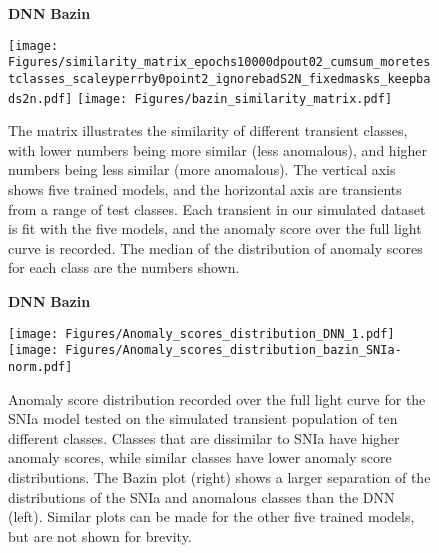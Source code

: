 \documentclass[fleqn,usenatbib]{mnras}
\begin{document}
\begin{figure*}
    \begin{flushleft}
        \hspace{0.26\linewidth} \textbf{DNN} \hspace{0.45\linewidth} \textbf{Bazin}\par\medskip
        \vspace{-7em}
    \end{flushleft}
    \centering
    \texttt{[image: Figures/similarity\_matrix\_epochs10000dpout02\_cumsum\_moretestclasses\_scaleyperrby0point2\_ignorebadS2N\_fixedmasks\_keepbads2n.pdf]}
    \texttt{[image: Figures/bazin\_similarity\_matrix.pdf]}
    \vspace{-3em}
    \caption{The matrix illustrates the similarity of different transient classes, with lower numbers being more similar (less anomalous), and higher numbers being less similar (more anomalous). The vertical axis shows five trained models, and the horizontal axis are transients from a range of test classes. Each transient in our simulated dataset is fit with the five models, and the anomaly score over the full light curve is recorded. The median of the distribution of anomaly scores for each class are the numbers shown.}
    \label{fig:similarity_matrix}
\end{figure*}

\begin{figure*}
    \begin{flushleft}
        \hspace{0.27\linewidth} \textbf{DNN} \hspace{0.45\linewidth} \textbf{Bazin}\par\medskip
        \vspace{-0.1em}
    \end{flushleft}
    \centering
    \texttt{[image: Figures/Anomaly\_scores\_distribution\_DNN\_1.pdf]}
    \texttt{[image: Figures/Anomaly\_scores\_distribution\_bazin\_SNIa-norm.pdf]}
    \caption{Anomaly score distribution recorded over the full light curve for the SNIa model tested on the simulated transient population of ten different classes. Classes that are dissimilar to SNIa have higher anomaly scores, while similar classes have lower anomaly score distributions. The Bazin plot (right) shows a larger separation of the distributions of the SNIa and anomalous classes than the DNN (left). Similar plots can be made for the other five trained models, but are not shown for brevity.}
    \label{fig:Anomaly_score_distribution}
\end{figure*}
\end{document}
